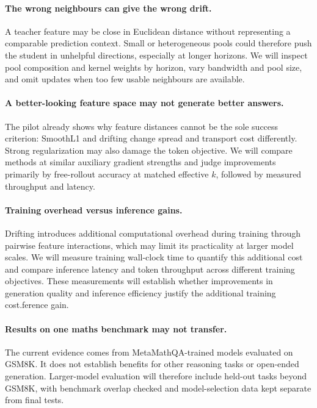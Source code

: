 \documentclass{article}
\begin{document}
\paragraph{The wrong neighbours can give the wrong drift.}
A teacher feature may be close in Euclidean distance without representing a comparable prediction context. Small or heterogeneous pools could therefore push the student in unhelpful directions, especially at longer horizons. We will inspect pool composition and kernel weights by horizon, vary bandwidth and pool size, and omit updates when too few usable neighbours are available.

\paragraph{A better-looking feature space may not generate better answers.}
The pilot already shows why feature distances cannot be the sole success criterion: SmoothL1 and drifting change spread and transport cost differently. Strong regularization may also damage the token objective. We will compare methods at similar auxiliary gradient strengths and judge improvements primarily by free-rollout accuracy at matched effective $k$, followed by measured throughput and latency.

\paragraph{Training overhead versus inference gains.}
Drifting introduces additional computational overhead
during training through pairwise feature interactions,
which may limit its practicality at larger model scales.
We will measure training wall-clock time to quantify
this additional cost and compare inference latency
and token throughput across different training objectives.
These measurements will establish whether improvements
in generation quality and inference efficiency justify
the additional training cost.ference gain.

\paragraph{Results on one maths benchmark may not transfer.}
The current evidence comes from MetaMathQA-trained models evaluated on GSM8K. It does not establish benefits for other reasoning tasks or open-ended generation. Larger-model evaluation will therefore include held-out tasks beyond GSM8K, with benchmark overlap checked and model-selection data kept separate from final tests.
\end{document}
